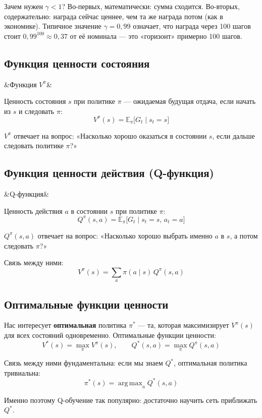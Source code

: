 \documentclass[a4paper, 11pt]{article}
\newenvironment{defbox}[1][]{%
  \begin{mdframed}[style=defstyle]
  \ifx&#1&\else{\bfseries\color{defblue}#1.}\quad\fi\ignorespaces
}{%
  \end{mdframed}
}
\newcommand{\E}{\mathbb{E}}
\DeclareMathOperator*{\argmax}{arg\,max}
\begin{document}
Зачем нужен $\gamma < 1$? Во-первых, математически: сумма сходится.
Во-вторых, содержательно: награда сейчас ценнее, чем та же награда потом
(как в экономике). Типичное значение $\gamma = 0{,}99$ означает, что
награда через 100 шагов стоит $0{,}99^{100} \approx 0{,}37$ от её
номинала — это «горизонт» примерно 100 шагов.

\subsection{Функция ценности состояния}

\begin{defbox}[Функция $V^\pi$]
Ценность состояния $s$ при политике $\pi$ — ожидаемая будущая отдача,
если начать из $s$ и следовать $\pi$:
\[
  V^\pi(s) = \E_\pi\bigl[G_t \;\big|\; s_t = s\bigr]
\]
\end{defbox}

$V^\pi$ отвечает на вопрос: «Насколько хорошо оказаться в состоянии $s$,
если дальше следовать политике $\pi$?»

\subsection{Функция ценности действия (Q-функция)}

\begin{defbox}[Q-функция]
Ценность действия $a$ в состоянии $s$ при политике $\pi$:
\[
  Q^\pi(s, a) = \E_\pi\bigl[G_t \;\big|\; s_t = s,\, a_t = a\bigr]
\]
\end{defbox}

$Q^\pi(s,a)$ отвечает на вопрос: «Насколько хорошо выбрать именно $a$ в $s$,
а потом следовать $\pi$?»

Связь между ними:
\[
  V^\pi(s) = \sum_a \pi(a \mid s)\, Q^\pi(s, a)
\]

\subsection{Оптимальные функции ценности}

Нас интересует \textbf{оптимальная} политика $\pi^*$ — та, которая
максимизирует $V^\pi(s)$ для всех состояний одновременно. Оптимальные
функции ценности:
\[
  V^*(s) = \max_\pi V^\pi(s), \qquad
  Q^*(s, a) = \max_\pi Q^\pi(s, a)
\]

Связь между ними фундаментальна: если мы знаем $Q^*$, оптимальная
политика тривиальна:
\[
  \pi^*(s) = \argmax_{a} Q^*(s, a)
\]

Именно поэтому Q-обучение так популярно: достаточно научить сеть
приближать $Q^*$.
\end{document}
